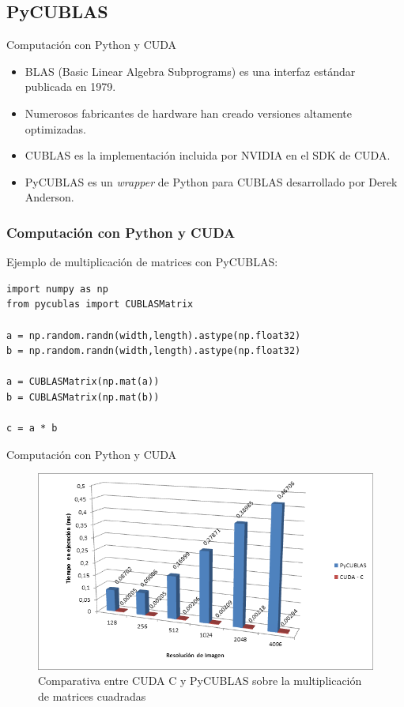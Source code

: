 \documentclass{beamer}
\begin{document}
\subsection{PyCUBLAS}

\begin{frame}{Computación con Python y CUDA}
  \begin{itemize}
    \item BLAS (Basic Linear Algebra Subprograms) es una interfaz estándar publicada en 1979.
    \item Numerosos fabricantes de hardware han creado versiones altamente optimizadas.
    \item CUBLAS es la implementación incluida por NVIDIA en el SDK de CUDA.
    \item PyCUBLAS es un \emph{wrapper} de Python para CUBLAS desarrollado por Derek Anderson.
  \end{itemize}
\end{frame}

\begin{frame}[fragile]
\frametitle{Computación con Python y CUDA}
  Ejemplo de multiplicación de matrices con PyCUBLAS:    
  \begin{lstlisting}
import numpy as np
from pycublas import CUBLASMatrix

a = np.random.randn(width,length).astype(np.float32)
b = np.random.randn(width,length).astype(np.float32)

a = CUBLASMatrix(np.mat(a))
b = CUBLASMatrix(np.mat(b))

c = a * b
  \end{lstlisting}
\end{frame}

\begin{frame}{Computación con Python y CUDA}
  \begin{figure}
    \begin{center}
      \includegraphics[width=.8\textwidth]{pycublas.png}
      \caption{Comparativa entre CUDA C y PyCUBLAS sobre la multiplicación de matrices cuadradas}
    \end{center}
  \end{figure}
\end{frame}
\end{document}
